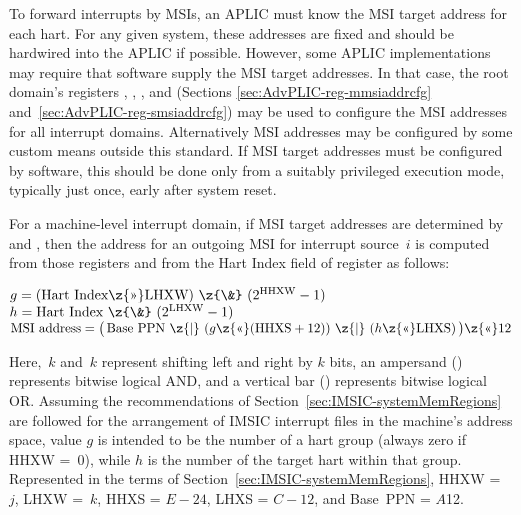 To forward interrupts by MSIs, an APLIC must know the MSI target address
for each hart.
For any given system, these addresses are fixed and should be hardwired
into the APLIC if possible.
However, some APLIC implementations may require that software supply the
MSI target addresses.
In that case, the root domain's registers ,
, , and 
(Sections \ref{sec:AdvPLIC-reg-mmsiaddrcfg}
and~\ref{sec:AdvPLIC-reg-smsiaddrcfg}) may be used to configure the
MSI addresses for all interrupt domains.
Alternatively MSI addresses may be configured by some custom means
outside this standard.
If MSI target addresses must be configured by software, this should
be done only from a suitably privileged execution mode, typically just
once, early after system reset.

For a machine-level interrupt domain, if MSI target addresses are
determined by  and , then the address
for an outgoing MSI for interrupt source~$i$ is computed from those
registers and from the Hart Index field of register  as
follows:
\begin{displayLinesTable}
$g =
  (\mbox{Hart Index\z{>>}LHXW})\mbox{ \z{\&} }(\mbox{2}^{\rm HHXW}-\mbox{1})$\\
$h = \mbox{Hart Index \z{\&} }(\mbox{2}^{\rm LHXW}-\mbox{1})$\\
$\mbox{MSI address} =
  \bigl(\,
    \mbox{Base PPN \z{|} }(g\mbox{\z{<<}}(\mbox{HHXS}+\mbox{12}))
      \mbox{ \z{|} }(h\mbox{\z{<<}LHXS})
  \,\bigr)\mbox{\z{<<}12}$
\end{displayLinesTable}
Here, \z{<<}$\,k$ and \z{>>}$\,k$ represent shifting left and right by
$k$ bits, an ampersand (\z{\&}) represents bitwise logical AND, and a
vertical bar (\z{|}) represents bitwise logical OR.
Assuming the recommendations of
Section~\ref{sec:IMSIC-systemMemRegions} are followed for the
arrangement of IMSIC interrupt files in the machine's address space,
value $g$ is intended to be the number of a hart group (always zero
if HHXW =~0), while $h$ is the number of the target hart within that
group.
Represented in the terms of Section~\ref{sec:IMSIC-systemMemRegions},
HHXW =~$j$, LHXW =~$k$, HHXS = ${E-24}$, LHXS = ${C-12}$, and
Base~PPN = $A$\z{>>}12.

